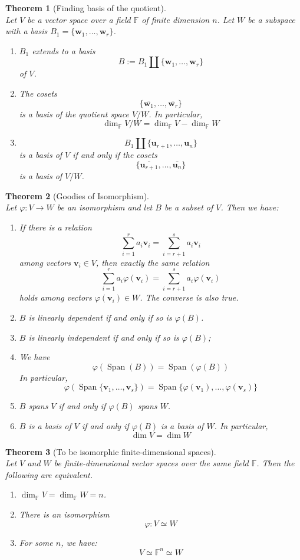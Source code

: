 \documentclass[12pt]{article}
\newtheorem{theorem}{Theorem}[section]
\theoremstyle{definition}
\DeclareMathOperator{\spn}{Span}
\begin{document}
\begin{theorem}[Finding basis of the quotient]
\hfill\\\normalfont
Let $V$ be a vector space over a field $\mathbb{F}$ of finite dimension $n$. Let $W$ be a subspace with a basis $B_1=\{\mathbf{w}_1,\ldots,\mathbf{w}_r\}$.
\begin{enumerate}[label=(\arabic*)]
\item $B_1$ extends to a basis
\[
B:=B_1\coprod\{\mathbf{w}_1,\ldots,\mathbf{w}_r\}
\]
of $V$.
\item The cosets
\[
\{\bar{\mathbf{w}_1},\ldots,\bar{\mathbf{w}_r}\}
\]
is a basis of the quotient space $V/W$. In particular,
\[
\dim_\mathbb{F}V/W=\dim_\mathbb{F}V-\dim_\mathbb{F}W
\]
\item 
\[
B_1\coprod\{\mathbf{u}_{r+1},\ldots,\mathbf{u}_n\}
\]
is a basis of $V$ if and only if the cosets
\[
\{\bar{\mathbf{u}_{r+1}},\ldots,\bar{\mathbf{u}_n}\}
\]
is a basis of $V/W$.
\end{enumerate}
\end{theorem}
\begin{theorem}[Goodies of Isomorphism]\hfill\\\normalfont
Let $\varphi:V\to W$ be an isomorphism and let $B$ be a subset of $V$. Then we have:
\begin{enumerate}[label=(\arabic*)]
\item If there is a relation
\[
\sum_{i=1}^r a_i\mathbf{v}_i = \sum_{i=r+1}^sa_i \mathbf{v}_i
\]
among vectors $\mathbf{v}_i\in V$, then exactly the same relation
\[
\sum_{i=1}^r a_i\varphi(\mathbf{v}_i) = \sum_{i=r+1}^sa_i \varphi(\mathbf{v}_i)
\]
holds among vectors $\varphi(\mathbf{v}_i)\in W$. The converse is also true.
\item $B$ is linearly dependent if and only if so is $\varphi(B)$.
\item $B$ is linearly independent if and only if so is $\varphi(B)$;
\item We have 
\[
\varphi(\spn(B))=\spn(\varphi(B))
\]
In particular, 
\[
\varphi(\spn\{\mathbf{v}_1,\ldots,\mathbf{v}_s\})=\spn\{\varphi(\mathbf{v}_1),\ldots, \varphi(\mathbf{v}_s)\}
\]
\item $B$ spans $V$ if and only if $\varphi(B)$ spans $W$.
\item $B$ is a basis of $V$ if and only if $\varphi(B)$ is a basis of $W$. In particular,
\[
\dim V = \dim W
\]
\end{enumerate}
\end{theorem}
\begin{theorem}[To be isomorphic finite-dimensional spaces]
\hfill\\\normalfont Let $V$ and $W$ be finite-dimensional vector spaces over the same field $\mathbb{F}$. Then the following are equivalent.
\begin{enumerate}[label = (\arabic*)]
\item $\dim_\mathbb{F}V=\dim_\mathbb{F}W=n$.
\item There is an isomorphism
\[
\varphi:V\simeq W
\]
\item For some $n$, we have:
\[
V\simeq \mathbb{F}^n\simeq W
\]
\end{enumerate}
\end{theorem}
\end{document}
